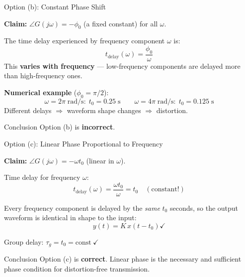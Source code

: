 \documentclass{beamer}
\begin{document}
\begin{frame}{Option (b): Constant Phase Shift}

\textbf{Claim:} $\angle G(j\omega) = -\phi_0$ (a fixed constant) for all $\omega$.

\vspace{0.5em}
The time delay experienced by frequency component $\omega$ is:
\[
  t_{\text{delay}}(\omega) = \frac{\phi_0}{\omega}
\]
This \textbf{varies with frequency} — low-frequency components are delayed more
than high-frequency ones.

\vspace{0.4em}
\textbf{Numerical example} ($\phi_0 = \pi/2$):
\[
  \omega = 2\pi\;\text{rad/s}:\; t_0 = 0.25\;\text{s}
  \qquad
  \omega = 4\pi\;\text{rad/s}:\; t_0 = 0.125\;\text{s}
\]
Different delays $\Rightarrow$ waveform shape changes $\Rightarrow$ distortion.

\vspace{0.4em}
\begin{block}{Conclusion}
  Option (b) is \textbf{incorrect}.
\end{block}
\end{frame}

\begin{frame}{Option (c): Linear Phase Proportional to Frequency}

\textbf{Claim:} $\angle G(j\omega) = -\omega t_0$ (linear in $\omega$).

\vspace{0.5em}
Time delay for frequency $\omega$:
\[
  t_{\text{delay}}(\omega) = \frac{\omega t_0}{\omega} = t_0 \quad (\text{constant!})
\]

Every frequency component is delayed by the \emph{same} $t_0$ seconds, so the
output waveform is identical in shape to the input:
\[
  y(t) = K\,x(t-t_0) \checkmark
\]

Group delay: $\tau_g = t_0 = \text{const}\ \checkmark$

\vspace{0.4em}
\begin{block}{Conclusion}
  Option (c) is \textbf{correct}. Linear phase is the necessary and sufficient
  phase condition for distortion-free transmission.
\end{block}
\end{frame}
\end{document}

